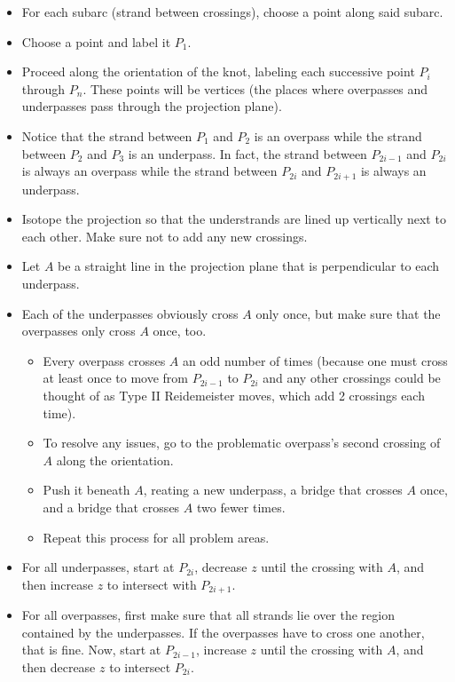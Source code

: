 \documentclass[titlepage]{article}
\numberwithin{figure}{section}
\numberwithin{table}{section}
\numberwithin{equation}{section}
\begin{document}
\begin{itemize}
\begin{itemize}
        \item For each subarc (strand between crossings), choose a point along said subarc.
        \item Choose a point and label it $P_1$.
        \item Proceed along the orientation of the knot, labeling each successive point $P_i$ through $P_n$. These points will be vertices (the places where overpasses and underpasses pass through the projection plane).
        \item Notice that the strand between $P_1$ and $P_2$ is an overpass while the strand between $P_2$ and $P_3$ is an underpass. In fact, the strand between $P_{2i-1}$ and $P_{2i}$ is always an overpass while the strand between $P_{2i}$ and $P_{2i+1}$ is always an underpass.
        \item Isotope the projection so that the understrands are lined up vertically next to each other. Make sure not to add any new crossings.
        \item Let $A$ be a straight line in the projection plane that is perpendicular to each underpass.
        \item Each of the underpasses obviously cross $A$ only once, but make sure that the overpasses only cross $A$ once, too.
        \begin{itemize}
            \item Every overpass crosses $A$ an odd number of times (because one must cross at least once to move from $P_{2i-1}$ to $P_{2i}$ and any other crossings could be thought of as Type II Reidemeister moves, which add 2 crossings each time).
            \item To resolve any issues, go to the problematic overpass's second crossing of $A$ along the orientation.
            \item Push it beneath $A$, reating a new underpass, a bridge that crosses $A$ once, and a bridge that crosses $A$ two fewer times.
            \item Repeat this process for all problem areas.
        \end{itemize}
        \item For all underpasses, start at $P_{2i}$, decrease $z$ until the crossing with $A$, and then increase $z$ to intersect with $P_{2i+1}$.
        \item For all overpasses, first make sure that all strands lie over the region contained by the underpasses. If the overpasses have to cross one another, that is fine. Now, start at $P_{2i-1}$, increase $z$ until the crossing with $A$, and then decrease $z$ to intersect $P_{2i}$.

\end{itemize}
\end{itemize}
\end{document}
